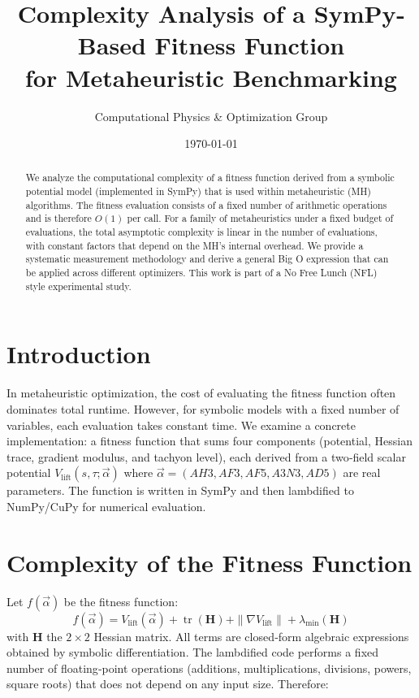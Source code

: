 \documentclass[11pt]{article}
\title{Complexity Analysis of a SymPy‐Based Fitness Function\\ for Metaheuristic Benchmarking}
\author{Computational Physics \& Optimization Group}
\date{\today}
\begin{document}
\maketitle

\begin{abstract}
We analyze the computational complexity of a fitness function derived from a symbolic potential model (implemented in SymPy) that is used within metaheuristic (MH) algorithms. The fitness evaluation consists of a fixed number of arithmetic operations and is therefore $O(1)$ per call. For a family of metaheuristics under a fixed budget of evaluations, the total asymptotic complexity is linear in the number of evaluations, with constant factors that depend on the MH’s internal overhead. We provide a systematic measurement methodology and derive a general Big O expression that can be applied across different optimizers. This work is part of a No Free Lunch (NFL) style experimental study.
\end{abstract}

\section{Introduction}
In metaheuristic optimization, the cost of evaluating the fitness function often dominates total runtime. However, for symbolic models with a fixed number of variables, each evaluation takes constant time. We examine a concrete implementation: a fitness function that sums four components (potential, Hessian trace, gradient modulus, and tachyon level), each derived from a two‑field scalar potential $V_{\text{lift}}(s,\tau; \vec{\alpha})$ where $\vec{\alpha} = (AH3, AF3, AF5, A3N3, AD5)$ are real parameters. The function is written in SymPy and then lambdified to NumPy/CuPy for numerical evaluation.

\section{Complexity of the Fitness Function}
Let $f(\vec{\alpha})$ be the fitness function:
\[
f(\vec{\alpha}) = V_{\text{lift}}(\vec{\alpha}) + \operatorname{tr}(\mathbf{H}) + \|\nabla V_{\text{lift}}\| + \lambda_{\min}(\mathbf{H})
\]
with $\mathbf{H}$ the $2\times 2$ Hessian matrix. All terms are closed‑form algebraic expressions obtained by symbolic differentiation. The lambdified code performs a fixed number of floating‑point operations (additions, multiplications, divisions, powers, square roots) that does not depend on any input size. Therefore:
\end{document}
